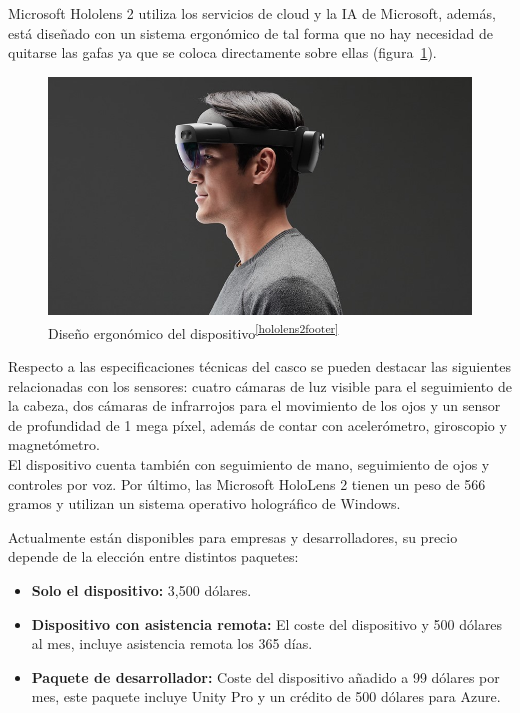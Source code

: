 Microsoft Hololens 2 utiliza los servicios de cloud y la IA de Microsoft, además, está diseñado con un sistema ergonómico de tal forma que no hay necesidad de quitarse las gafas ya que se coloca directamente sobre ellas (figura~\ref{fig:hololensErgonomicas}).\\
\begin{figure}
  \centering
    \includegraphics[scale=0.28]{Images/Estado del arte/hololens2_1.jpeg}
  \caption{Diseño ergonómico del dispositivo\textsuperscript{\ref{hololens2footer}}
  }
  
  \label{fig:hololensErgonomicas}
\end{figure}

Respecto a las especificaciones técnicas del casco se pueden destacar las siguientes relacionadas con los sensores: cuatro cámaras de luz visible para el seguimiento de la cabeza, dos cámaras de infrarrojos para el movimiento de los ojos y un sensor de profundidad de 1 mega píxel, además de contar con acelerómetro, giroscopio y magnetómetro.\\



El dispositivo cuenta también con seguimiento de mano, seguimiento de ojos y controles por voz.
Por último, las Microsoft HoloLens 2 tienen un peso de 566 gramos y utilizan un sistema operativo holográfico de Windows.

Actualmente están disponibles para empresas y desarrolladores, su precio depende de la elección entre distintos paquetes:

\begin{itemize}
    \item \textbf{Solo el dispositivo:} 3,500 dólares.
    \item \textbf{Dispositivo con asistencia remota:} El coste del dispositivo y 500 dólares al mes, incluye asistencia remota los 365 días.
    \item \textbf{Paquete de desarrollador:} Coste del dispositivo añadido a 99 dólares por mes, este paquete incluye Unity Pro y un crédito de 500 dólares para Azure.
\end{itemize}




